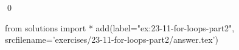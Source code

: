 
\begin{ex}
  \label{ex:23-11-for-loops-part2}
  
  \qed
\end{ex}
\begin{python0}
from solutions import *
add(label="ex:23-11-for-loops-part2",
    srcfilename='exercises/23-11-for-loops-part2/answer.tex')
\end{python0}
